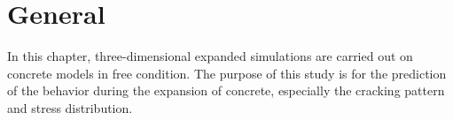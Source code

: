 


\section{General}

In this chapter, three-dimensional expanded simulations are carried out on concrete models in free condition. The purpose of this study is for the prediction of the behavior during the expansion of concrete, especially the cracking pattern and stress distribution.



 





















